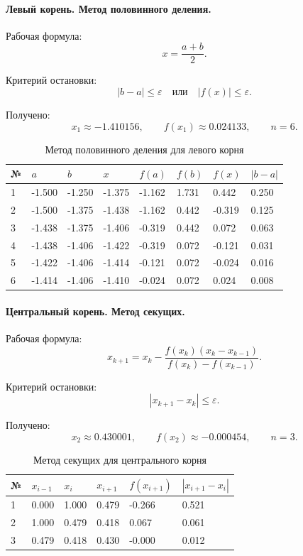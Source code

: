 \documentclass[12pt,a4paper]{article}
\begin{document}
\paragraph{Левый корень. Метод половинного деления.}
Рабочая формула:
\[
x = \frac{a+b}{2}.
\]

Критерий остановки:
\[
|b-a| \le \varepsilon \quad \text{или} \quad |f(x)| \le \varepsilon.
\]

Получено:
\[
x_1 \approx -1.410156,\qquad f(x_1) \approx 0.024133,\qquad n = 6.
\]

\begin{table}[H]
  \centering
  \caption{Метод половинного деления для левого корня}
  \begin{tabular}{C{10mm}C{18mm}C{18mm}C{18mm}C{18mm}C{18mm}C{18mm}C{18mm}}
    \toprule
    № & $a$ & $b$ & $x$ & $f(a)$ & $f(b)$ & $f(x)$ & $|b-a|$ \\
     & -1.500 & -1.250 & -1.375 & -1.162 & 1.731 & 0.442 & 0.250 \\
    2 & -1.500 & -1.375 & -1.438 & -1.162 & 0.442 & -0.319 & 0.125 \\
    3 & -1.438 & -1.375 & -1.406 & -0.319 & 0.442 & 0.072 & 0.063 \\
    4 & -1.438 & -1.406 & -1.422 & -0.319 & 0.072 & -0.121 & 0.031 \\
    5 & -1.422 & -1.406 & -1.414 & -0.121 & 0.072 & -0.024 & 0.016 \\
    6 & -1.414 & -1.406 & -1.410 & -0.024 & 0.072 & 0.024 & 0.008 \\
    \bottomrule
  \end{tabular}
\end{table}

\paragraph{Центральный корень. Метод секущих.}
Рабочая формула:
\[
x_{k+1} = x_k - \frac{f(x_k)(x_k - x_{k-1})}{f(x_k)-f(x_{k-1})}.
\]

Критерий остановки:
\[
|x_{k+1} - x_k| \le \varepsilon.
\]

Получено:
\[
x_2 \approx 0.430001,\qquad f(x_2) \approx -0.000454,\qquad n = 3.
\]

\begin{table}[H]
  \centering
  \caption{Метод секущих для центрального корня}
  \begin{tabular}{C{10mm}C{20mm}C{20mm}C{20mm}C{24mm}C{26mm}}
    \toprule
    № & $x_{i-1}$ & $x_i$ & $x_{i+1}$ & $f(x_{i+1})$ & $|x_{i+1}-x_i|$ \\
     & 0.000 & 1.000 & 0.479 & -0.266 & 0.521 \\
    2 & 1.000 & 0.479 & 0.418 & 0.067 & 0.061 \\
    3 & 0.479 & 0.418 & 0.430 & -0.000 & 0.012 \\
    \bottomrule
  \end{tabular}
\end{table}
\end{document}
